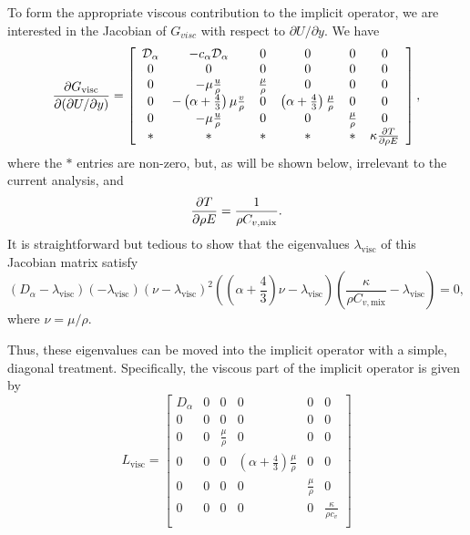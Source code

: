 To form the appropriate viscous contribution to the implicit
operator, we are interested in the Jacobian of $G_{visc}$ with respect
to $\partial U / \partial y$.  We have
%
\begin{equation*}
\frac{\partial G_{\mathrm{visc}}}{\partial (\partial U/ \partial y)} = \left[ \begin{array}{cccccc}
\mathcal{D}_{\alpha} & -c_{\alpha} \mathcal{D}_{\alpha} & 0 & 0 & 0 & 0 \\
0 & 0 & 0 & 0 & 0 & 0 \\
0 & - \mu \frac{u}{\rho} & \frac{\mu}{\rho} & 0 & 0 & 0 \\
0 & - \left(\alpha + \frac{4}{3} \right) \mu \frac{v}{\rho} & 0 & \left(\alpha + \frac{4}{3} \right) \frac{\mu}{\rho} & 0 & 0 \\
0 & - \mu \frac{u}{\rho} & 0 & 0 & \frac{\mu}{\rho} & 0 \\
* & * & * & * & * & \kappa \frac{\partial T}{\partial \rho E} \\
\end{array} \right],
\end{equation*}
% 
where the $*$ entries are non-zero, but, as will be shown below,
irrelevant to the current analysis, and
%
\begin{equation*}
\frac{\partial T}{\partial \rho E} = \frac{1}{\rho C_{v,\text{mix}}}.
\end{equation*}
% 
It is straightforward but tedious to show that the eigenvalues
$\lambda_{\mathrm{visc}}$ of this Jacobian matrix satisfy
%
\begin{equation*}
(D_{\alpha} - \lambda_{\mathrm{visc}}) (-\lambda_{\mathrm{visc}}) (\nu - \lambda_{\mathrm{visc}})^2  \left( \left( \alpha + \frac{4}{3} \right) \nu - \lambda_{\mathrm{visc}} \right) \left( \frac{\kappa}{\rho C_{v,\text{mix}}} - \lambda_{\mathrm{visc}} \right) = 0,
\end{equation*}
% 
where $\nu = \mu/\rho$.

Thus, these eigenvalues can be moved into the implicit operator with
a simple, diagonal treatment.  Specifically, the viscous part of the
implicit operator is given by
%
\begin{equation}
L_{\mathrm{visc}} = 
\left[
\begin{array}{cccccc}
 D_{\alpha} & 0 & 0 & 0 & 0 & 0 \\
 0 & 0 & 0 & 0 & 0 & 0 \\
 0 & 0 & \frac{\mu}{\rho} & 0 & 0 & 0 \\
 0 & 0 & 0 & \left(\alpha+\frac{4}{3}\right)\frac{\mu}{\rho} & 0 & 0 \\
 0 & 0 & 0 & 0 & \frac{\mu}{\rho} & 0 \\
 0 & 0 & 0 & 0 & 0 & \frac{\kappa}{\rho c_v} \\
\end{array}
\right]
\end{equation}


